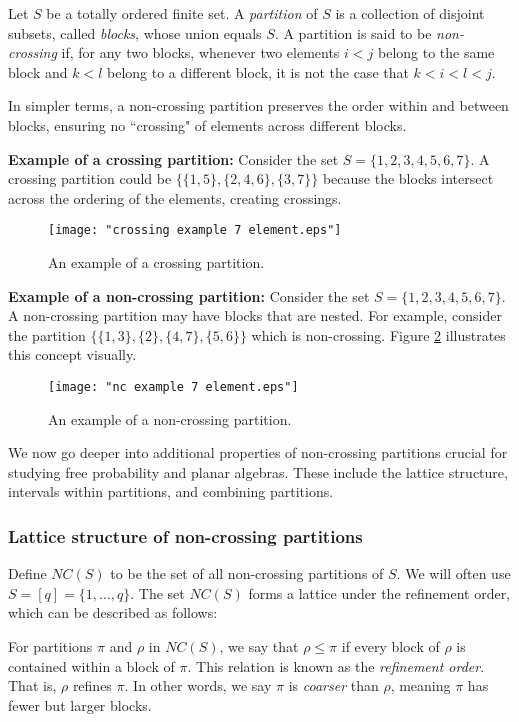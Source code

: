 \begin{definition}
Let $S$ be a totally ordered finite set. A \textit{partition} of $S$ is a collection of disjoint subsets, called \textit{blocks}, whose union equals $S$. A partition is said to be \textit{non-crossing} if, for any two blocks, whenever two elements $i < j$ belong to the same block and $k < l$ belong to a different block, it is not the case that $k < i < l < j$.
\end{definition}

In simpler terms, a non-crossing partition preserves the order within and between blocks, ensuring no ``crossing" of elements across different blocks.

\textbf{Example of a crossing partition:} Consider the set $S = \{1, 2, 3, 4, 5, 6, 7\}$. A crossing partition could be $\{\{1, 5\}, \{2, 4, 6\}, \{3, 7\}\}$ because the blocks intersect across the ordering of the elements, creating  crossings.

\begin{figure}[ht!]
    \centering
     \texttt{[image: "crossing example 7 element.eps"]}
    \caption{An example of a crossing partition.}
    \label{fig:Crossing partition example}
\end{figure}

\textbf{Example of a non-crossing partition:} Consider the set $S = \{1, 2, 3, 4, 5, 6, 7\}$. A non-crossing partition may have blocks that are nested. For example, consider the partition $\{\{1, 3\}, \{2\}, \{4, 7\}, \{5, 6\}\}$ which is non-crossing. Figure \ref{fig:Non-crossing partition example} illustrates this concept visually.

\begin{figure}[ht!]
    \centering
    \texttt{[image: "nc example 7 element.eps"]}
    \caption{An example of a non-crossing partition.}
    \label{fig:Non-crossing partition example}
\end{figure}

We now go deeper into additional properties of non-crossing partitions crucial for studying free probability and planar algebras. These include the lattice structure, intervals within partitions, and combining partitions.

\subsubsection{Lattice structure of non-crossing partitions}

Define $NC(S)$ to be the set of all non-crossing partitions of $S$.
We will often use $S = [q] = \{1,\ldots,q\}$.
The set $NC(S)$ forms a lattice under the refinement order, which can be described as follows:
\begin{definition}
For partitions $\pi$ and $\rho$ in $NC(S)$, we say that $\rho \leq \pi$ if every block of $\rho$ is contained within a block of $\pi$. This relation is known as the \textit{refinement order}. That is, $\rho$ refines $\pi$. In other words, we say $\pi$ is \textit{coarser} than $\rho$, meaning $\pi$ has fewer but larger blocks.
\end{definition}

